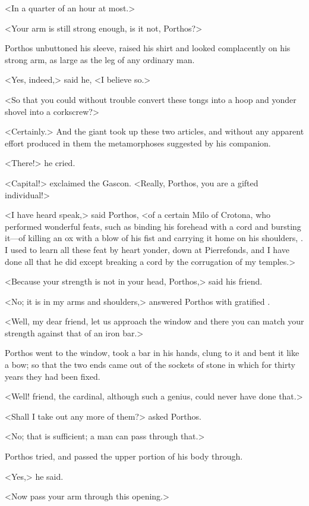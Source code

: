 <In a quarter of an hour at most.>

<Your arm is still strong enough, is it not, Porthos?>

Porthos unbuttoned his sleeve, raised his shirt and looked complacently on his strong arm, as large as the leg of any ordinary man.

<Yes, indeed,> said he, <I believe so.>

<So that you could without trouble convert these tongs into a hoop and yonder shovel into a corkscrew?>

<Certainly.> And the giant took up these two articles, and without any apparent effort produced in them the metamorphoses suggested by his companion.

<There!> he cried.

<Capital!> exclaimed the Gascon. <Really, Porthos, you are a gifted individual!>

<I have heard speak,> said Porthos, <of a certain Milo of Crotona, who performed wonderful feats, such as binding his forehead with a cord and bursting it—of killing an ox with a blow of his fist and carrying it home on his shoulders, . I used to learn all these feat by heart yonder, down at Pierrefonds, and I have done all that he did except breaking a cord by the corrugation of my temples.>

<Because your strength is not in your head, Porthos,> said his friend.

<No; it is in my arms and shoulders,> answered Porthos with gratified .

<Well, my dear friend, let us approach the window and there you can match your strength against that of an iron bar.>

Porthos went to the window, took a bar in his hands, clung to it and bent it like a bow; so that the two ends came out of the sockets of stone in which for thirty years they had been fixed.

<Well! friend, the cardinal, although such a genius, could never have done that.>

<Shall I take out any more of them?> asked Porthos.

<No; that is sufficient; a man can pass through that.>

Porthos tried, and passed the upper portion of his body through.

<Yes,> he said.

<Now pass your arm through this opening.>


